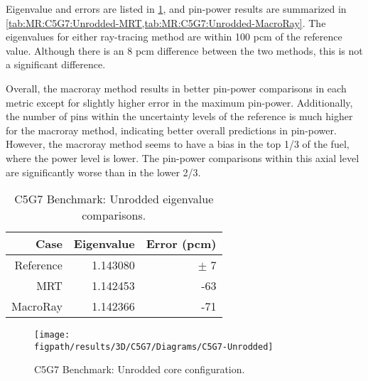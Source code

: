 {{{{        Eigenvalue and errors are listed in \cref{tab:MR:C5G7:Unrodded-Eigenvalues}, and pin-power results are summarized in \cref{tab:MR:C5G7:Unrodded-MRT,tab:MR:C5G7:Unrodded-MacroRay}.
        The eigenvalues for either ray-tracing method are within 100 pcm of the reference value.
        Although there is an 8 pcm difference between the two methods, this is not a significant difference.

        Overall, the macroray method results in better pin-power comparisons in each metric except for slightly higher error in the maximum pin-power.
        Additionally, the number of pins within the uncertainty levels of the reference is much higher for the macroray method, indicating better overall predictions in pin-power.
        However, the macroray method seems to have a bias in the top 1/3 of the fuel, where the power level is lower.
        The pin-power comparisons within this axial level are significantly worse than in the lower 2/3.

        \begin{table}[htbp]
          \centering
          \caption{C5G7 Benchmark: Unrodded eigenvalue comparisons. \label{tab:MR:C5G7:Unrodded-Eigenvalues}}
          \begin{tabular}{rrr}\toprule
            Case & Eigenvalue & Error (pcm)\\\midrule
            Reference & 1.143080 & $\pm$ 7\\
            MRT       & 1.142453 & -63\\
            MacroRay  & 1.142366 & -71\\\bottomrule
          \end{tabular}
        \end{table}

        \begin{figure}[htbp]
          \centering
          \texttt{[image: \\figpath/results/3D/C5G7/Diagrams/C5G7-Unrodded]}
          \caption{C5G7 Benchmark: Unrodded core configuration. \label{fig:MR:C5G7:Unrodded}}
        \end{figure}

}}}}
